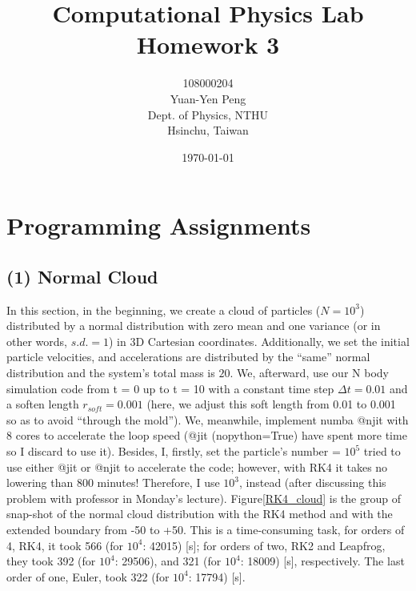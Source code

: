 \documentclass[12pt]{article}
\begin{document}
\title{\textbf{{\normalsize Computational Physics Lab}\\
                Homework 3}}
\author{108000204\\
        Yuan-Yen Peng\\
        Dept. of Physics, NTHU\\
        Hsinchu, Taiwan}
\date{\today}
\maketitle


\section{Programming Assignments}
    \subsection{(1) Normal Cloud}
    In this section, in the beginning, we create a cloud of particles ($N = 10^3$) distributed by a normal distribution with zero mean and one variance (or in other words, $s.d. = 1$) in 3D Cartesian coordinates. Additionally, we set the initial particle velocities, and accelerations are distributed by the ``same'' normal distribution and the system's total mass is $20$. We, afterward, use our N body simulation code from t = 0 up to t = 10 with a constant time step $\Delta t = 0.01$ and a soften length $r_{soft} = 0.001$ (here, we adjust this soft length from 0.01 to 0.001 so as to avoid ``through the mold''). We, meanwhile, implement {\ttfamily numba @njit} with 8 cores to accelerate the loop speed ({\ttfamily @jit (nopython=True)} have spent more time so I discard to use it). Besides, I, firstly, set the particle's number = $10^5$ tried to use either {\ttfamily @jit} or {\ttfamily @njit} to accelerate the code; however, with {\ttfamily RK4} it takes no lowering than 800 minutes! Therefore, I use $10^3$, instead (after discussing this problem with professor in Monday's lecture). Figure\ref{RK4_cloud} is the group of snap-shot of the normal cloud distribution with the RK4 method and with the extended boundary from -50 to +50. This is a time-consuming task, for orders of 4, RK4, it took 566 (for $10^4$: 42015) [s]; for orders of two, RK2 and Leapfrog, they took 392 (for $10^4$: 29506), and 321 (for $10^4$: 18009) [s], respectively. The last order of one, Euler, took 322 (for $10^4$: 17794) [s].
\end{document}
